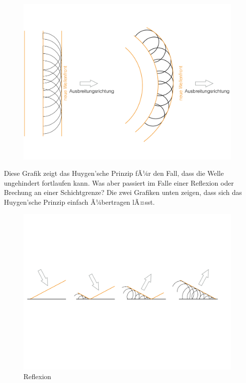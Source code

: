 \begin{figure}[H]
	\centering
	\includegraphics[width = \textwidth]{SeismikBilder/HuygensPrinzip1}
\end{figure}

Diese Grafik zeigt das Huygen'sche Prinzip fÃ¼r den Fall, dass die Welle ungehindert fortlaufen kann. Was aber passiert im Falle einer Reflexion oder Brechung an einer Schichtgrenze? 
Die zwei Grafiken unten zeigen, dass sich das Huygen'sche Prinzip einfach Ã¼bertragen lÃ¤sst. 

\begin{figure}[H]
	\centering
	\includegraphics[width = \textwidth]{SeismikBilder/HuygensReflexion}
	\caption*{Reflexion}
\end{figure}

